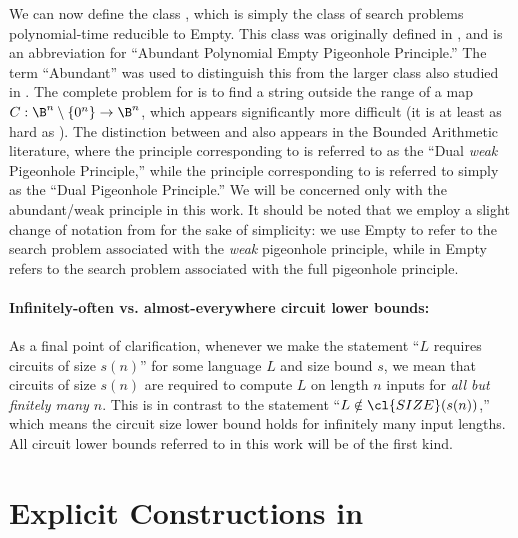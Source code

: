 We can now define the class , which is simply the class of search problems polynomial-time reducible to {\sc Empty}. This class was originally defined in \cite{total}, and is an abbreviation for ``Abundant Polynomial Empty Pigeonhole Principle.'' The term ``Abundant'' was used to distinguish this from the larger class  also studied in \cite{total}. The complete problem for  is to find a string outside the range of a map $C:\B^n \setminus \{0^n\} \rightarrow \B^n$, which appears significantly more difficult (it is at least as hard as  \cite{total}). The distinction between  and  also appears in the Bounded Arithmetic literature, where the principle corresponding to  is referred to as the ``Dual \emph{weak} Pigeonhole Principle,'' while the principle corresponding to  is referred to simply as the ``Dual Pigeonhole Principle.'' We will be concerned only with the abundant/weak principle in this work. It should be noted that we employ a slight change of notation from \cite{total} for the sake of simplicity: we use {\sc Empty} to refer to the search problem associated with the \emph{weak} pigeonhole principle, while in \cite{total} {\sc Empty} refers to the search problem associated with the full pigeonhole principle.

\paragraph{Infinitely-often vs. almost-everywhere circuit lower bounds:} As a final point of clarification, whenever we make the statement ``$L$ requires circuits of size $s(n)$'' for some language $L$ and size bound $s$, we mean that circuits of size $s(n)$ are required to compute $L$ on length $n$ inputs for \emph{all but finitely many $n$}. This is in contrast to the statement ``$L \notin \cl{SIZE}(s(n))$,'' which means the circuit size lower bound holds for infinitely many input lengths. All circuit lower bounds referred to in this work will be of the first kind.

\section{Explicit Constructions in }\label{sec:constructions-in-apepp}

